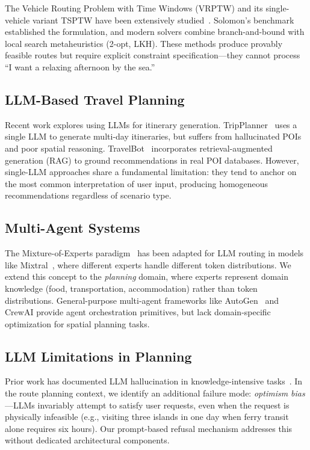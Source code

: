 \documentclass[11pt]{article}
\begin{document}
The Vehicle Routing Problem with Time Windows (VRPTW) and its single-vehicle variant TSPTW have been extensively studied~\cite{toth2014vehicle}. Solomon's benchmark~\cite{solomon1987algorithms} established the formulation, and modern solvers combine branch-and-bound with local search metaheuristics (2-opt, LKH). These methods produce provably feasible routes but require explicit constraint specification---they cannot process ``I want a relaxing afternoon by the sea.''

\subsection{LLM-Based Travel Planning}

Recent work explores using LLMs for itinerary generation. TripPlanner~\cite{chen2024tripplanner} uses a single LLM to generate multi-day itineraries, but suffers from hallucinated POIs and poor spatial reasoning. TravelBot~\cite{wang2024travelbot} incorporates retrieval-augmented generation (RAG) to ground recommendations in real POI databases. However, single-LLM approaches share a fundamental limitation: they tend to anchor on the most common interpretation of user input, producing homogeneous recommendations regardless of scenario type.

\subsection{Multi-Agent Systems}

The Mixture-of-Experts paradigm~\cite{shazeer2017outrageously} has been adapted for LLM routing in models like Mixtral~\cite{jiang2024mixtral}, where different experts handle different token distributions. We extend this concept to the \textit{planning} domain, where experts represent domain knowledge (food, transportation, accommodation) rather than token distributions. General-purpose multi-agent frameworks like AutoGen~\cite{wu2023autogen} and CrewAI provide agent orchestration primitives, but lack domain-specific optimization for spatial planning tasks.

\subsection{LLM Limitations in Planning}

Prior work has documented LLM hallucination in knowledge-intensive tasks~\cite{ji2023survey}. In the route planning context, we identify an additional failure mode: \textit{optimism bias}---LLMs invariably attempt to satisfy user requests, even when the request is physically infeasible (e.g., visiting three islands in one day when ferry transit alone requires six hours). Our prompt-based refusal mechanism addresses this without dedicated architectural components.
\end{document}
